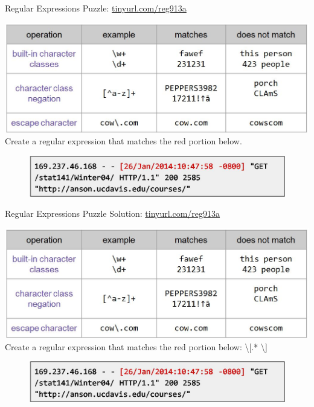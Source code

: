 \documentclass[aspectratio=169]{../latex_main/tntbeamer}  %
\begin{document}
	\begin{frame}{Regular Expressions Puzzle: \url{tinyurl.com/reg913a}}
	    
	    \includegraphics[scale=.45]{Bild16}\\
	    Create a regular expression that matches the red portion below.
	    \begin{figure}
	        \centering
	        \includegraphics[scale=.5]{Bild17}
	    \end{figure}

	\end{frame}
	
	
	
	\begin{frame}{Regular Expressions Puzzle Solution: \url{tinyurl.com/reg913a}}
	    
	    \includegraphics[scale=.45]{Bild16}\\
	    Create a regular expression that matches the red portion below: \textbackslash[.* \textbackslash]
	    \begin{figure}
	        \centering
	        \includegraphics[scale=.5]{Bild17}
	    \end{figure}

	\end{frame}
	
\end{document}

